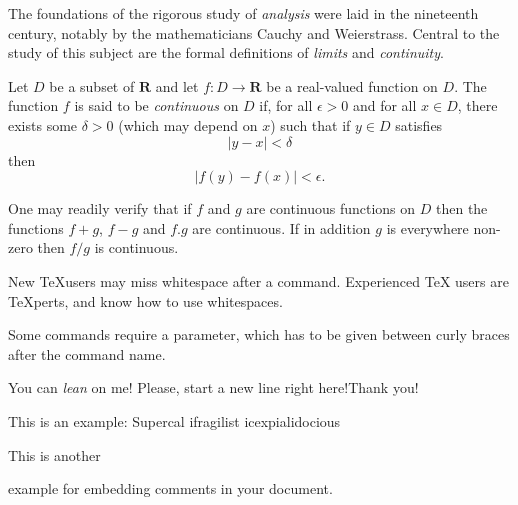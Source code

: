 \documentclass[a4paper,12pt]{article}
\begin{document}

The foundations of the rigorous study of \textit{analysis} were laid in the 
nineteenth century, notably by the mathematicians Cauchy and Weierstrass. 
Central to the study of this subject are the formal definitions of 
\textit{limits} and \textit{continuity}.

Let $D$ be a subset of $\textbf{R} $ and let $f \colon D \to \textbf{R}$ be
a real-valued function on $D$.
The function $f$ is said to be \textit{continuous} on $D$
if, for all $\epsilon > 0$ and for all $x \in D$, there exists some $\delta > 0$ 
(which may depend on $x$) such that if $y \in D$ satisfies
\[ |y - x| < \delta \] 
then 
\[ |f(y) - f(x)| < \epsilon. \]

One may readily verify that if $f$ and $g$ are continuous functions on $D$ then 
the functions $f+g$, $f-g$ and $f.g$ are continuous. 
If in addition $g$ is everywhere non-zero then $f/g$ is continuous.


New \TeX users may miss whitespace after a command. %
Experienced \TeX{} users are \TeX perts, and know how to use whitespaces. %

Some commands require a parameter, which has to be given between curly braces { } after the command name.


You can \textsl{lean} on me!
Please, start a new line right here!\newline Thank you!

This is an %
example: Supercal%
ifragilist%
icexpialidocious

This is another
\begin{comment}
rather stupid, but helpful
\end{comment}
example for embedding comments in your document.
\end{document}
